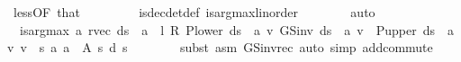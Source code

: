 \begin{isabellebody}
\ less{\isacharparenleft}{\kern0pt}{}{\isacharparenright}{\kern0pt}{\isacharbrackleft}{\kern0pt}OF\ that{\isacharbrackright}{\kern0pt}\ \isanewline
\ \ \ \ \ \ \isamarkupfalse%
\ is{\isacharunderscore}{\kern0pt}dec{\isacharunderscore}{\kern0pt}det{\isacharunderscore}{\kern0pt}def\ is{\isacharunderscore}{\kern0pt}arg{\isacharunderscore}{\kern0pt}max{\isacharunderscore}{\kern0pt}linorder\isanewline
\ \ \ \ \ \ \isamarkupfalse%
\ auto\isanewline
\ \ \ \ \isamarkupfalse%
\ {\isacharasterisk}{\kern0pt}{\isacharcolon}{\kern0pt}\ {\isachardoublequoteopen}is{\isacharunderscore}{\kern0pt}arg{\isacharunderscore}{\kern0pt}max\ {\isacharparenleft}{\kern0pt}{\isasymlambda}a{\isachardot}{\kern0pt}\ {\isacharparenleft}{\kern0pt}r{\isacharunderscore}{\kern0pt}vec\ {\isacharparenleft}{\kern0pt}d{\isacharparenleft}{\kern0pt}s\ {\isacharcolon}{\kern0pt}{\isacharequal}{\kern0pt}\ a{\isacharparenright}{\kern0pt}{\isacharparenright}{\kern0pt}\ {\isacharplus}{\kern0pt}\ l\ {\isacharasterisk}{\kern0pt}\isactrlsub R\ {\isacharparenleft}{\kern0pt}P{\isacharunderscore}{\kern0pt}lower\ {\isacharparenleft}{\kern0pt}d{\isacharparenleft}{\kern0pt}s\ {\isacharcolon}{\kern0pt}{\isacharequal}{\kern0pt}\ a{\isacharparenright}{\kern0pt}{\isacharparenright}{\kern0pt}\ {\isacharasterisk}{\kern0pt}v\ {\isacharparenleft}{\kern0pt}GS{\isacharunderscore}{\kern0pt}inv\ {\isacharparenleft}{\kern0pt}d{\isacharparenleft}{\kern0pt}s\ {\isacharcolon}{\kern0pt}{\isacharequal}{\kern0pt}\ a{\isacharparenright}{\kern0pt}{\isacharparenright}{\kern0pt}\ v{\isacharparenright}{\kern0pt}\ {\isacharplus}{\kern0pt}\ P{\isacharunderscore}{\kern0pt}upper\ {\isacharparenleft}{\kern0pt}d{\isacharparenleft}{\kern0pt}s\ {\isacharcolon}{\kern0pt}{\isacharequal}{\kern0pt}\ a{\isacharparenright}{\kern0pt}{\isacharparenright}{\kern0pt}\ {\isacharasterisk}{\kern0pt}v\ v{\isacharparenright}{\kern0pt}{\isacharparenright}{\kern0pt}\ {\isachardollar}{\kern0pt}\ s{\isacharparenright}{\kern0pt}\ {\isacharparenleft}{\kern0pt}{\isasymlambda}a{\isachardot}{\kern0pt}\ a\ {\isasymin}\ A\ s{\isacharparenright}{\kern0pt}\ {\isacharparenleft}{\kern0pt}d\ s{\isacharparenright}{\kern0pt}{\isachardoublequoteclose}\isanewline
\ \ \ \ \ \ \isamarkupfalse%
\ {\isacharparenleft}{\kern0pt}subst\ {\isacharparenleft}{\kern0pt}asm{\isacharparenright}{\kern0pt}\ GS{\isacharunderscore}{\kern0pt}inv{\isacharunderscore}{\kern0pt}rec{\isacharparenright}{\kern0pt}\ {\isacharparenleft}{\kern0pt}auto\ simp{\isacharcolon}{\kern0pt}\ add{\isachardot}{\kern0pt}commute{\isacharparenright}{\kern0pt}\isanewline

\end{isabellebody}
